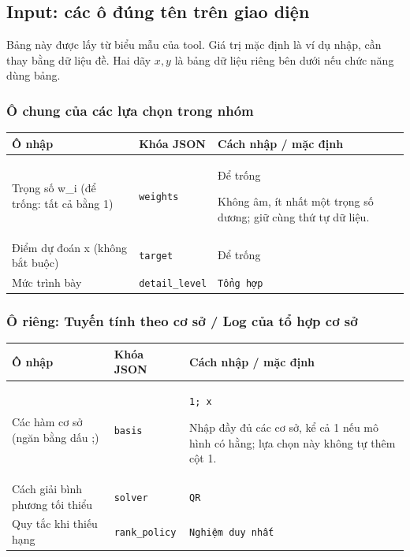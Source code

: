 \subsection*{Input: các ô đúng tên trên giao diện}
Bảng này được lấy từ biểu mẫu của tool. Giá trị mặc định là ví dụ nhập, cần thay bằng dữ liệu đề. Hai dãy $x,y$ là bảng dữ liệu riêng bên dưới nếu chức năng dùng bảng.
\subsubsection*{Ô chung của các lựa chọn trong nhóm}
\begin{center}\small\begin{tabular}{@{}p{.32\linewidth}p{.17\linewidth}p{.43\linewidth}@{}}\toprule
Ô nhập & Khóa JSON & Cách nhập / mặc định\\\midrule
Trọng số w\_i (để trống: tất cả bằng 1) & \texttt{weights} & Để trống
\par Không âm,\allowbreak{} ít nhất một trọng số dương;\allowbreak{} giữ cùng thứ tự dữ liệu.\\[3pt]
Điểm dự đoán x (không bắt buộc) & \texttt{target} & Để trống\\[3pt]
Mức trình bày & \texttt{detail\_level} & \texttt{Tổng hợp}\\[3pt]
\bottomrule\end{tabular}\end{center}
\subsubsection*{Ô riêng: Tuyến tính theo cơ sở /\allowbreak{} Log của tổ hợp cơ sở}
\begin{center}\small\begin{tabular}{@{}p{.32\linewidth}p{.17\linewidth}p{.43\linewidth}@{}}\toprule
Ô nhập & Khóa JSON & Cách nhập / mặc định\\\midrule
Các hàm cơ sở (ngăn bằng dấu ;\allowbreak{}) & \texttt{basis} & \texttt{1;\allowbreak{} x}
\par Nhập đầy đủ các cơ sở,\allowbreak{} kể cả 1 nếu mô hình có hằng;\allowbreak{} lựa chọn này không tự thêm cột 1.\\[3pt]
Cách giải bình phương tối thiểu & \texttt{solver} & \texttt{QR}\\[3pt]
Quy tắc khi thiếu hạng & \texttt{rank\_policy} & \texttt{Nghiệm duy nhất}\\[3pt]
\bottomrule\end{tabular}\end{center}
